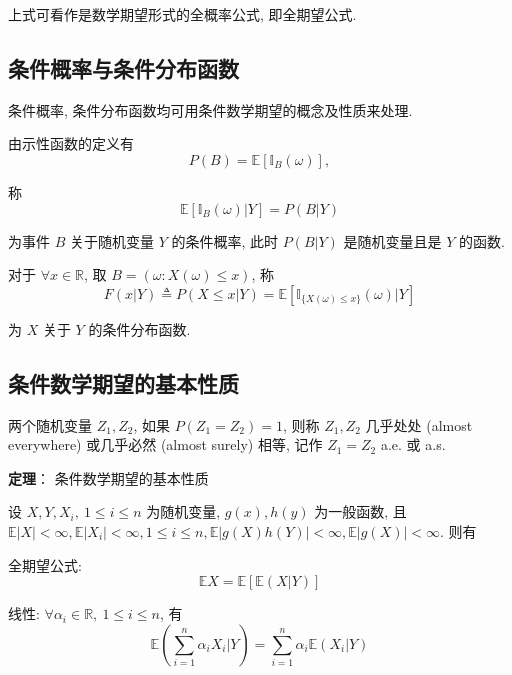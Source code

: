 \documentclass[openany]{ctexbook}
\theoremstyle{kaiti}
\theoremstyle{normal}
\begin{document}
上式可看作是数学期望形式的全概率公式, 即全期望公式.

\subsection{条件概率与条件分布函数}

条件概率, 条件分布函数均可用条件数学期望的概念及性质来处理. 

由示性函数的定义有
\begin{equation}
  P(B)=\mathbb{E}[\mathbb{I}_B(\omega)],
\end{equation}

称
\begin{equation}
  \mathbb{E}[\mathbb{I}_B(\omega)|Y]=P(B|Y)
\end{equation}

为事件 $B$ 关于随机变量 $Y$ 的条件概率, 此时 $P(B|Y)$ 是随机变量且是 $Y$ 的函数.

对于 $\forall x\in\mathbb{R}$, 取 $B=(\omega:X(\omega)\leqslant x)$, 称
\begin{equation}
  F(x|Y)\triangleq P(X\leqslant x|Y)=\mathbb{E}[\mathbb{I}_{\{X(\omega)\leqslant x\}}(\omega)|Y]
\end{equation}

为 $X$ 关于 $Y$ 的条件分布函数.

\subsection{条件数学期望的基本性质}

两个随机变量 $Z_1,Z_2$, 如果 $P(Z_1=Z_2)=1$, 则称 $Z_1,Z_2$ 几乎处处 (almost everywhere) 或几乎必然 (almost surely) 相等, 记作 $Z_1=Z_2$ a.e. 或 a.s.

\textbf{定理}： 条件数学期望的基本性质

设 $X,Y,X_i,~1\leqslant i\leqslant n$ 为随机变量, $g(x),h(y)$ 为一般函数, 且 $\mathbb{E}|X|<\infty, \mathbb{E}|X_i|<\infty, 1\leqslant i\leqslant n, \mathbb{E}|g(X)h(Y)|<\infty, \mathbb{E}|g(X)|<\infty$. 则有

全期望公式:
\begin{equation}
  \mathbb{E}X=\mathbb{E}[\mathbb{E}(X|Y)]
\end{equation}


线性: $\forall \alpha_i\in\mathbb{R},~1\leqslant i\leqslant n$, 有
\begin{equation}
  \mathbb{E}\left(\sum_{i=1}^n\alpha_iX_i\Big|Y\right)=\sum_{i=1}^n\alpha_i\mathbb{E}(X_i|Y)
\end{equation}
\end{document}
